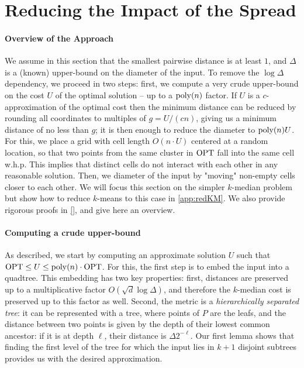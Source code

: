 \section{Reducing the Impact of the Spread}
\label{sec:logdelta}
\newcommand{\boxsize}{\textsc{MaxDist}}

\paragraph*{Overview of the Approach}
We assume in this section that the smallest pairwise distance is at least $1$, and $\Delta$ is a (known) upper-bound on the diameter of the input.
To remove the $\log\Delta$ dependency, we proceed in two steps: first, we compute a very crude upper-bound on the cost $U$ of the optimal solution -- up to
a $\operatorname{poly}(n)$ factor.  If $U$ is a $c$-approximation of the optimal cost then the minimum distance can be reduced by rounding all coordinates to multiples of $g
= U/(cn)$, giving us a minimum distance of no less than $g$; it is then enough to reduce the diameter to $\operatorname{poly}(n) U$.  For this, we place a grid with cell length
$O(n \cdot U)$ centered at a random location, so that two points from the same cluster in $\text{OPT}$ fall into the same cell w.h.p. This implies that distinct cells do not interact with each other
in any reasonable solution.  Then, we diameter of the input by "moving" non-empty cells closer to each other. We will focus this section on the simpler $k$-median
problem but show how to reduce $k$-means to this case in \cref{app:redKM}. We also provide rigorous proofs in \ref{}, and give here an overview.


\paragraph*{Computing a crude upper-bound}

As described, we start by computing an approximate solution $U$ such that $\text{OPT} \leq U \leq \operatorname{poly}(n) \cdot \text{OPT}$. For this, the first step is to embed the input
into a quadtree. This embedding has two key properties: first, distances are preserved up to a multiplicative factor $O(\sqrt{d} \log \Delta)$, and therefore the $k$-median cost is preserved up to this factor as well. Second, the metric is a \emph{hierarchically separated tree}: it can be represented with a tree, where points of $P$ are the leafs, and the distance between two points is given by the depth of their lowest common ancestor: if it is at depth $\ell$, their distance is $\Delta 2^{-\ell}$. 
 Our first lemma shows
that finding the first level of the tree for which the input lies in $k+1$ disjoint subtrees provides us with the desired approximation. 

